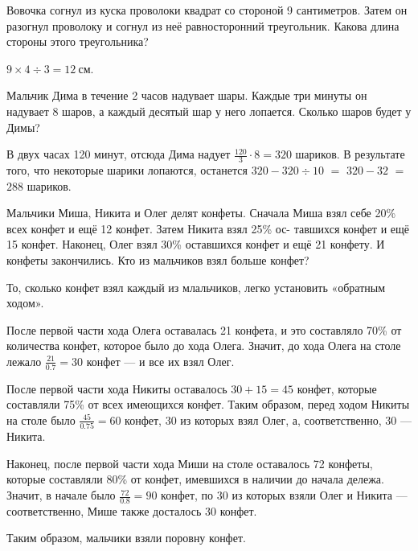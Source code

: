 

\begin{itemize}

	\itA Вовочка согнул из куска проволоки квадрат со стороной 9 сантиметров. Затем он разогнул проволоку и согнул из неё равносторонний треугольник. Какова длина стороны этого треугольника?

	\itr $9 \times 4 \div 3 = \SI{12}{\text{см}}$.

	\itB Мальчик Дима в течение 2 часов надувает шары. Каждые три минуты он надувает 8 шаров, а каждый десятый шар у него лопается. Сколько шаров будет у Димы?
	
	\itr В двух часах 120 минут, отсюда Дима надует $\tfrac{120}{3} \cdot 8 = 320$ шариков. В результате того, что некоторые шарики лопаются, останется $320 - 320 \div 10$ $=$ $320 - 32$ $=$ $288$ шариков.
	
	\itC Мальчики Миша, Никита и Олег делят конфеты. Сначала Миша взял себе 20\% всех конфет и ещё 12 конфет. Затем Никита взял 25\% ос- тавшихся конфет и ещё 15 конфет. Наконец, Олег взял 30\% оставшихся конфет и ещё 21 конфету. И конфеты закончились. Кто из мальчиков взял больше конфет?
	
	\itr То, сколько конфет взял каждый из млальчиков, легко установить «обратным ходом».
	
	После первой части хода Олега оставалась 21 конфета, и это составляло 70\% от количества конфет, которое было до хода Олега. Значит, до хода Олега на столе лежало $\tfrac{21}{0.7} = 30$ конфет — и все их взял Олег.
	
	После первой части хода Никиты оставалось $30+15=45$ конфет, которые составляли 75\% от всех имеющихся конфет. Таким образом, перед ходом Никиты на столе было $\tfrac{45}{0.75}=60$ конфет, 30 из которых взял Олег, а, соответственно, 30 — Никита.
	
	Наконец, после первой части хода Миши на столе оставалось 72 \linebreak конфеты, которые составляли 80\% от конфет, имевшихся в наличии до начала дележа. Значит, в начале было $\tfrac{72}{0.8} = 90$ конфет, по 30 из которых взяли Олег и Никита — соответственно, Мише также досталось 30 конфет.
	
	Таким образом, мальчики взяли поровну конфет.

\end{itemize}



